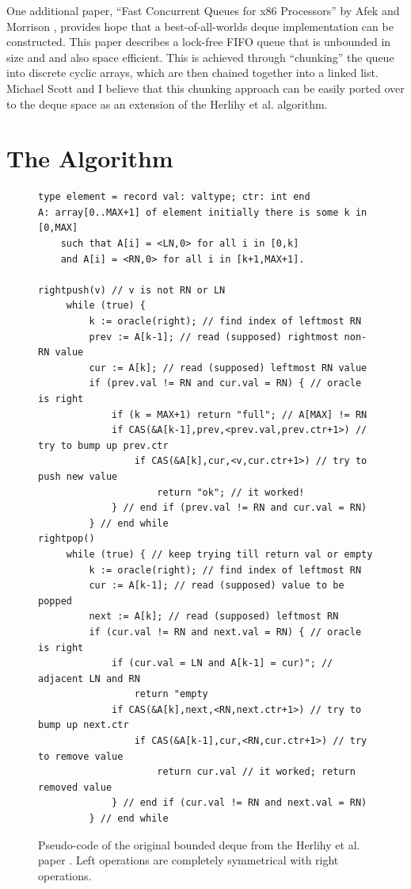 \documentclass[11pt, letterpaper]{article}
\begin{document}
        One additional paper, ``Fast Concurrent Queues for x86 Processors'' by Afek and Morrison \cite{afek}, provides hope that a best-of-all-worlds deque implementation can be constructed. This paper describes a lock-free FIFO queue that is unbounded in size and and also space efficient. This is achieved through ``chunking'' the queue into discrete cyclic arrays, which are then chained together into a linked list. Michael Scott and I believe that this chunking approach can be easily ported over to the deque space as an extension of the Herlihy et al. algorithm.

    \section{The Algorithm}
        \begin{figure}[t!]
            \footnotesize\begin{verbatim}
type element = record val: valtype; ctr: int end
A: array[0..MAX+1] of element initially there is some k in [0,MAX]
    such that A[i] = <LN,0> for all i in [0,k]
    and A[i] = <RN,0> for all i in [k+1,MAX+1].

rightpush(v) // v is not RN or LN
     while (true) {
         k := oracle(right); // find index of leftmost RN
         prev := A[k-1]; // read (supposed) rightmost non-RN value
         cur := A[k]; // read (supposed) leftmost RN value
         if (prev.val != RN and cur.val = RN) { // oracle is right
             if (k = MAX+1) return "full"; // A[MAX] != RN
             if CAS(&A[k-1],prev,<prev.val,prev.ctr+1>) // try to bump up prev.ctr
                 if CAS(&A[k],cur,<v,cur.ctr+1>) // try to push new value
                     return "ok"; // it worked!
             } // end if (prev.val != RN and cur.val = RN)
         } // end while
rightpop()
     while (true) { // keep trying till return val or empty
         k := oracle(right); // find index of leftmost RN
         cur := A[k-1]; // read (supposed) value to be popped
         next := A[k]; // read (supposed) leftmost RN
         if (cur.val != RN and next.val = RN) { // oracle is right
             if (cur.val = LN and A[k-1] = cur)"; // adjacent LN and RN
                 return "empty
             if CAS(&A[k],next,<RN,next.ctr+1>) // try to bump up next.ctr
                 if CAS(&A[k-1],cur,<RN,cur.ctr+1>) // try to remove value
                     return cur.val // it worked; return removed value
             } // end if (cur.val != RN and next.val = RN)
         } // end while
            \end{verbatim}
            \caption{Pseudo-code of the original bounded deque from the Herlihy et al. paper \cite{herlihy}. Left operations are completely symmetrical with right operations.}
            \label{code::bounded}
        \end{figure}
\end{document}
